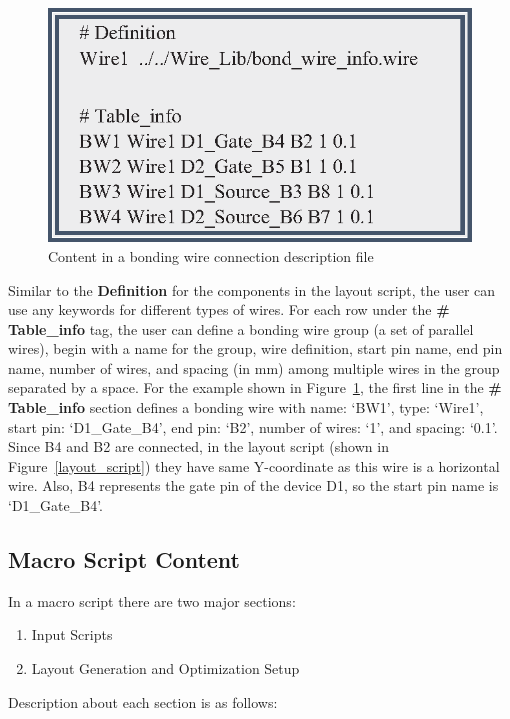 \documentclass[11pt]{article}
\begin{document}
\begin{enumerate}
    
    \begin{figure}[hbt]
    \centering
    \includegraphics[width=3.5 in]{figs/v_1.9_figs/bw_table.eps}
    \caption{Content in a bonding wire connection description file}
    \label{wire_setup_table}
    \end{figure}
    
    Similar to the \textbf{Definition} for the components in the layout script, the user can use any keywords for different types of wires. For each row under the \textbf{\# Table\_info} tag, the user can define a bonding wire group (a set of parallel wires), begin with a name for the group, wire definition, start pin name, end pin name, number of wires, and spacing (in mm) among multiple wires in the group separated by a space. For the example shown in Figure~\ref{wire_setup_table}, the first line in the \textbf{\# Table\_info} section defines a bonding wire with name: `BW1', type: `Wire1', start pin: `D1\_Gate\_B4', end pin: `B2', number of wires: `1', and spacing: `0.1'. Since B4 and B2 are connected, in the layout script (shown in Figure~\ref{layout_script}) they have same Y-coordinate as this wire is a horizontal wire. Also, B4 represents the gate pin of the device D1, so the start pin name is `D1\_Gate\_B4'.
    
\end{enumerate}

\subsection{Macro Script Content}
\label{sec-2-3}
In a macro script there are two major sections:
\begin{enumerate}
    \item Input Scripts
    \item Layout Generation and Optimization Setup
\end{enumerate}
Description about each section is as follows:
\end{document}
